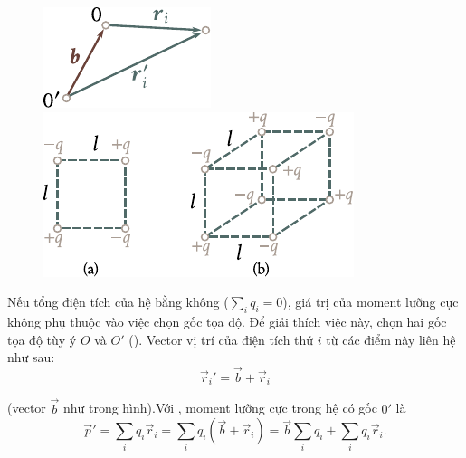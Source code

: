 \begin{figure}[!htb]
	\begin{minipage}[t]{0.4\linewidth}
		\begin{center}
			\includegraphics[scale=1]{figures/ch_01/fig_1_17.pdf}
			\caption[]{}
			\label{fig:1_17}
		\end{center}
	\end{minipage}
	\hspace{-0.05cm}
	\begin{minipage}[t]{0.6\linewidth}
		\begin{center}
			\includegraphics[scale=1]{figures/ch_01/fig_1_18.pdf}
			\caption[]{}
			\label{fig:1_18}
		\end{center}
	\end{minipage}
\vspace{-0.4cm}
\end{figure}

Nếu tổng điện tích của hệ bằng không ($\sum_iq_i=0$), giá trị của moment lưỡng cực không phụ thuộc vào việc chọn gốc tọa độ. Để giải thích việc này, chọn hai gốc tọa độ tùy ý $O$ và $O'$ (). Vector vị trí của điện tích thứ $i$ từ các điểm này liên hệ như sau:
\begin{equation}\label{eq:1_67}
	\vec{r}_i' = \vec{b} + \vec{r}_i
\end{equation}

\noindent
(vector $\vec{b}$ như trong hình).Với , moment lưỡng cực trong hệ có gốc $0'$ là
\begin{equation*}
	\vec{p}' = \sum_i q_i \vec{r}_i = \sum_i q_i (\vec{b} + \vec{r}_i) = \vec{b} \sum_i q_i + \sum_i q_i \vec{r}_i.
\end{equation*}

